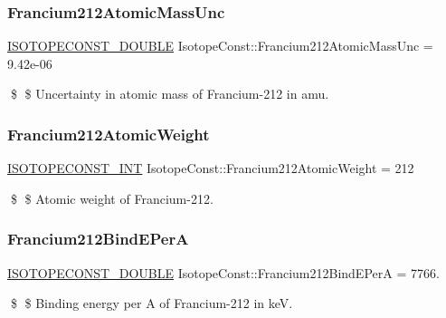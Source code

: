 \subsubsection{\texorpdfstring{Francium212\+Atomic\+Mass\+Unc}{Francium212AtomicMassUnc}}
{\footnotesize\ttfamily \mbox{\hyperlink{group___isotope_const-_macros_ga8f45a7272ce02c0b4c65c44636ed719a}{I\+S\+O\+T\+O\+P\+E\+C\+O\+N\+S\+T\+\_\+\+D\+O\+U\+B\+LE}} Isotope\+Const\+::\+Francium212\+Atomic\+Mass\+Unc = 9.\+42e-\/06}

\$ \$ Uncertainty in atomic mass of Francium-\/212 in amu. \mbox{\label{group___isotope_const-_francium-_fr212_ga81e478bdfaffb20773afdac191747f5a}} 
\subsubsection{\texorpdfstring{Francium212\+Atomic\+Weight}{Francium212AtomicWeight}}
{\footnotesize\ttfamily \mbox{\hyperlink{group___isotope_const-_macros_ga5f18360b3e99483a35c32d789e62621c}{I\+S\+O\+T\+O\+P\+E\+C\+O\+N\+S\+T\+\_\+\+I\+NT}} Isotope\+Const\+::\+Francium212\+Atomic\+Weight = 212}

\$ \$ Atomic weight of Francium-\/212. \mbox{\label{group___isotope_const-_francium-_fr212_ga8dded2c4f76d833acee97784fa3e36f9}} 
\subsubsection{\texorpdfstring{Francium212\+Bind\+E\+PerA}{Francium212BindEPerA}}
{\footnotesize\ttfamily \mbox{\hyperlink{group___isotope_const-_macros_ga8f45a7272ce02c0b4c65c44636ed719a}{I\+S\+O\+T\+O\+P\+E\+C\+O\+N\+S\+T\+\_\+\+D\+O\+U\+B\+LE}} Isotope\+Const\+::\+Francium212\+Bind\+E\+PerA = 7766.}

\$ \$ Binding energy per A of Francium-\/212 in keV. \mbox{\label{group___isotope_const-_francium-_fr212_ga7812c5cff709b599cb176c7bb0544e86}} 
